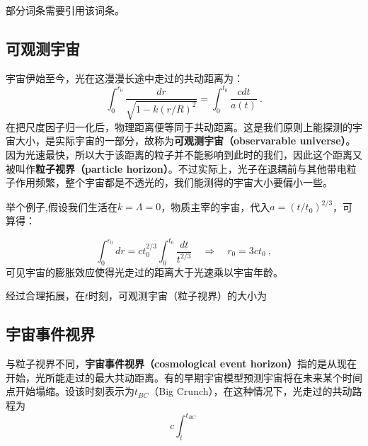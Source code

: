 
\begin{issues}
\issueTODO
部分词条需要引用该词条。
\end{issues}

\subsection{可观测宇宙}
宇宙伊始至今，光在这漫漫长途中走过的共动距离为：
\begin{equation}
\int_{0}^{r_{0}} \frac{d r}{\sqrt{1-k (r/R)^{2}}}=\int_{0}^{t_{0}} \frac{c d t}{a(t)}~.
\end{equation}
在把尺度因子归一化后，物理距离便等同于共动距离。这是我们原则上能探测的宇宙大小，是实际宇宙的一部分，故称为\textbf{可观测宇宙（observarable universe）}。因为光速最快，所以大于该距离的粒子并不能影响到此时的我们，因此这个距离又被叫作\textbf{粒子视界（particle horizon）}。不过实际上，光子在退耦前与其他带电粒子作用频繁，整个宇宙都是不透光的，我们能测得的宇宙大小要偏小一些。

举个例子,假设我们生活在$k=\Lambda=0$，物质主宰的宇宙，代入$a=(t/t_0)^{2/3}$，可算得：

\begin{equation}\int_0^{r_0}dr=ct_0^{2/3}\int_0^{t_0}\frac{dt}{t^{2/3}}\quad\Longrightarrow\quad r_0=3ct_0 ~,\end{equation}
可见宇宙的膨胀效应使得光走过的距离大于光速乘以宇宙年龄。

经过合理拓展，在$t$时刻，可观测宇宙（粒子视界）的大小为


\subsection{宇宙事件视界}
与粒子视界不同，\textbf{宇宙事件视界（cosmological event horizon）}指的是从现在开始，光所能走过的最大共动距离。有的早期宇宙模型预测宇宙将在未来某个时间点开始塌缩。设该时刻表示为$t_{BC}$（Big Crunch），在这种情况下，光走过的共动路程为
\begin{equation}
c\int^{t_{BC}}_{t}
\end{equation}